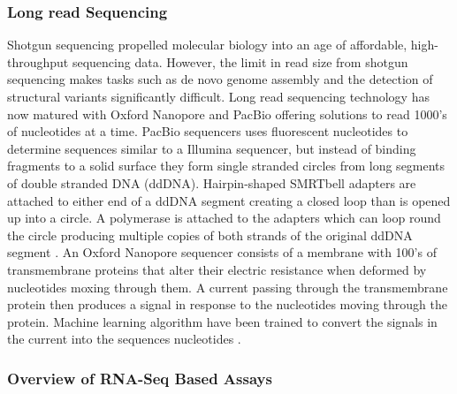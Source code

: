 \documentclass[../main.tex]{subfiles}
\begin{document}
\subsubsection{Long read Sequencing}

Shotgun sequencing propelled molecular biology into an age of affordable, high-throughput sequencing data.
However, the limit in read size from shotgun sequencing makes tasks such as de novo genome assembly and the detection of structural variants significantly difficult.
Long read sequencing technology has now matured with Oxford Nanopore and PacBio offering solutions to read 1000's of nucleotides at a time. 
PacBio sequencers uses fluorescent nucleotides to determine sequences similar to a Illumina sequencer, but instead of binding fragments to a solid surface they form single stranded circles from long segments of double stranded DNA (ddDNA).
Hairpin-shaped SMRTbell adapters are attached to either end of a ddDNA segment creating a closed loop than is opened up into a circle. 
A polymerase is attached to the adapters which can loop round the circle producing multiple copies of both strands of the original ddDNA segment \parencite{Hu2021}.
An Oxford Nanopore sequencer consists of a membrane with 100's of transmembrane proteins that alter their electric resistance when deformed by nucleotides moxing through them.  
A current passing through the transmembrane protein then produces a signal in response to the nucleotides moving through the protein.
Machine learning algorithm have been trained to convert the signals in the current into the sequences nucleotides \parencite{Jain2016}.

\subsubsection{Overview of RNA-Seq Based Assays}
\end{document}
